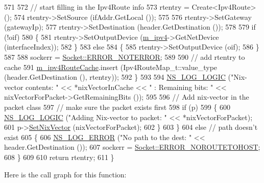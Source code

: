 \begin{DoxyCode}
571 
572           \textcolor{comment}{// start filling in the Ipv4Route info}
573           rtentry = Create<Ipv4Route> ();
574           rtentry->SetSource (ifAddr.GetLocal ());
575 
576           rtentry->SetGateway (gatewayIp);
577           rtentry->SetDestination (header.GetDestination ());
578 
579           \textcolor{keywordflow}{if} (!oif)
580             \{
581               rtentry->SetOutputDevice (\hyperlink{classns3_1_1Ipv4NixVectorRouting_a215cb71f30d85df9ec7176ca22620519}{m\_ipv4}->GetNetDevice (interfaceIndex));
582             \}
583           \textcolor{keywordflow}{else}
584             \{
585               rtentry->SetOutputDevice (oif);
586             \}
587 
588           sockerr = \hyperlink{classns3_1_1Socket_ada1328c5ae0c28cb2a982caf8f6d6ccaaa7eb006d73c5ad0117c5591fcb3469f7}{Socket::ERROR\_NOTERROR};
589 
590           \textcolor{comment}{// add rtentry to cache}
591           \hyperlink{classns3_1_1Ipv4NixVectorRouting_aeb85361b66489c60851f72f1493fdee7}{m\_ipv4RouteCache}.insert (Ipv4RouteMap\_t::value\_type (header.GetDestination (), 
      rtentry));
592         \}
593 
594       \hyperlink{group__logging_ga88acd260151caf2db9c0fc84997f45ce}{NS\_LOG\_LOGIC} (\textcolor{stringliteral}{"Nix-vector contents: "} << *nixVectorInCache << \textcolor{stringliteral}{" : Remaining bits: "} << 
      nixVectorForPacket->GetRemainingBits ());
595 
596       \textcolor{comment}{// Add  nix-vector in the packet class }
597       \textcolor{comment}{// make sure the packet exists first}
598       \textcolor{keywordflow}{if} (p)
599         \{
600           \hyperlink{group__logging_ga88acd260151caf2db9c0fc84997f45ce}{NS\_LOG\_LOGIC} (\textcolor{stringliteral}{"Adding Nix-vector to packet: "} << *nixVectorForPacket);
601           p->\hyperlink{classns3_1_1Packet_a7e02c5b608a578c845aafd838f155989}{SetNixVector} (nixVectorForPacket);
602         \}
603     \}
604   \textcolor{keywordflow}{else} \textcolor{comment}{// path doesn't exist}
605     \{
606       \hyperlink{group__logging_ga0261a8db1d4ac5f79417d117634fd455}{NS\_LOG\_ERROR} (\textcolor{stringliteral}{"No path to the dest: "} << header.GetDestination ());
607       sockerr = \hyperlink{classns3_1_1Socket_ada1328c5ae0c28cb2a982caf8f6d6ccaa0f8ecb5a4ddbce3bade35fa12c3d49e8}{Socket::ERROR\_NOROUTETOHOST};
608     \}
609 
610   \textcolor{keywordflow}{return} rtentry;
611 \}
\end{DoxyCode}


Here is the call graph for this function\+:



